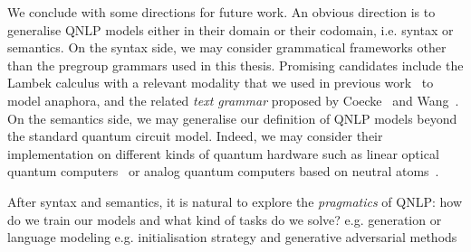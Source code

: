 We conclude with some directions for future work.
An obvious direction is to generalise QNLP models either in their domain or their codomain, i.e. syntax or semantics.
On the syntax side, we may consider grammatical frameworks other than the pregroup grammars used in this thesis.
Promising candidates include the Lambek calculus with a relevant modality that we used in previous work~\cite{McPheatEtAl21} to model anaphora, and the related \emph{text grammar} proposed by Coecke~\cite{Coecke21} and Wang~\cite{CoeckeWang21}.
On the semantics side, we may generalise our definition of QNLP models beyond the standard quantum circuit model.
Indeed, we may consider their implementation on different kinds of quantum hardware such as linear optical quantum computers~\cite{KokEtAl07} or analog quantum computers based on neutral atoms~\cite{HenrietEtAl20}.

After syntax and semantics, it is natural to explore the \emph{pragmatics} of QNLP: how do we train our models and what kind of tasks do we solve? e.g. generation or language modeling
e.g. initialisation strategy and generative adversarial methods
